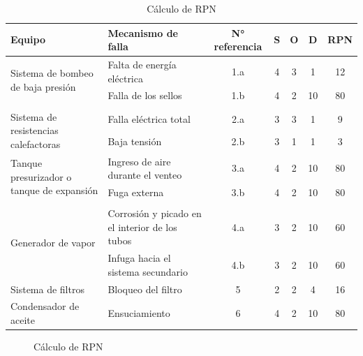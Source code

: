 \documentclass{article}
\begin{document}
\begin{table}[H]
\centering
\begin{tabularx}{\textwidth}{XXccccc}
\toprule
Equipo & Mecanismo de falla & N° referencia & S & O & D & RPN
\\
\midrule
\multirow{2}{7em}{Sistema de bombeo de baja presión} & Falta de energía eléctrica & 1.a & 4 & 3 & 1 & 12 \\
 & Falla de los sellos &  1.b & 4 & 2 & 10 & 80 \\ \\\midrule
\multirow{2}{7em}{Sistema de resistencias calefactoras} & Falla eléctrica \newline total & 2.a & 3 & 3 & 1 & 9 \\
 & Baja tensión &  2.b & 3 & 1 & 1 & 3 \\ \midrule
\multirow{2}{7em}{Tanque presurizador o tanque de expansión} & Ingreso de aire \newline durante el venteo & 3.a & 4 & 2 & 10 & 80 \\
 & Fuga externa &  3.b & 4 & 2 & 10 & 80\\ \\ \midrule
\multirow{2}{7em}{Generador de vapor} & Corrosión y picado en el interior de los tubos & 4.a & 3 & 2 & 10 & 60 \\
 & Infuga hacia el sistema secundario &  4.b & 3 & 2 & 10 & 60 \\\midrule
Sistema de filtros & Bloqueo del filtro & 5 & 2 & 2 & 4 & 16 \\\midrule
Condensador de aceite & Ensuciamiento & 6 & 4 & 2 & 10 & 80 \\
\bottomrule
\end{tabularx}
\caption{Cálculo de RPN}
\end{table}
\begin{figure}[H]
\begin{center}
\end{center}
\caption{Cálculo de RPN}
\end{figure}
\end{document}
